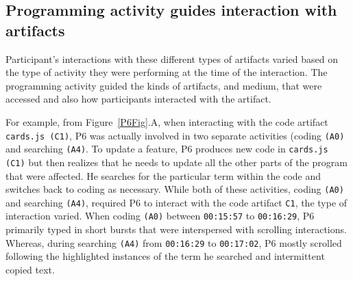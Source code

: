 \subsection{Programming activity guides interaction with artifacts}


Participant's interactions with these different types of artifacts varied based on the type of activity they were performing at the time of the interaction. The programming activity guided the kinds of artifacts, and medium, that were accessed and also how participants interacted with the artifact.


For example, from Figure~\ref{P6Fig}.A, when interacting with the code artifact \texttt{cards.js (C1)}, P6 was actually involved in two separate activities (coding \texttt{(A0)} and searching \texttt{(A4)}. To update a feature, P6 produces new code in \texttt{cards.js (C1)} but then realizes that he needs to update all the other parts of the program that were affected. He searches for the particular term within the code and switches back to coding as necessary. While both of these activities, coding \texttt{(A0)} and searching \texttt{(A4)}, required P6 to interact with the code artifact \texttt{C1}, the type of interaction varied. When coding \texttt{(A0)} between \texttt{00:15:57} to \texttt{00:16:29}, P6 primarily typed in short bursts that were interspersed with scrolling interactions. Whereas, during searching \texttt{(A4)} from \texttt{00:16:29} to \texttt{00:17:02}, P6 mostly scrolled following the highlighted instances of the term he searched and intermittent copied text.


